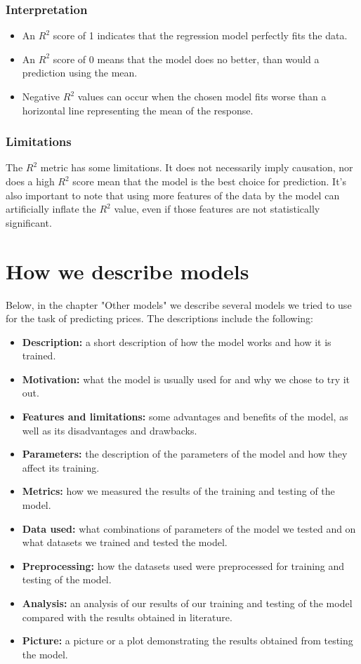 \subsubsection{Interpretation}
\begin{itemize}
	\item An \(R^2\) score of 1 indicates that the regression model perfectly fits the data.
	\item An \(R^2\) score of 0 means that the model does no better, than would a prediction using the mean.
	\item Negative \(R^2\) values can occur when the chosen model fits worse than a horizontal line representing the mean of the response.
\end{itemize}

\subsubsection{Limitations}
The \(R^2\) metric has some limitations. It does not necessarily imply causation, nor does a high \(R^2\) score mean that the model is the best choice for prediction. It's also important to note that using more features of the data by the model can artificially inflate the \(R^2\) value, even if those features are not statistically significant.


\section{How we describe models}
Below, in the chapter "Other models" we describe several models we tried to use for the task of predicting prices. The descriptions include the following:
\begin{itemize}
	\item \textbf{Description:} a short description of how the model works and how it is trained.
	\item \textbf{Motivation:} what the model is usually used for and why we chose to try it out.
	\item \textbf{Features and limitations:} some advantages and benefits of the model, as well as its disadvantages and drawbacks.
	\item \textbf{Parameters:} the description of the parameters of the model and how they affect its training.
	\item \textbf{Metrics:} how we measured the results of the training and testing of the model.
	\item \textbf{Data used:} what combinations of parameters of the model we tested and on what datasets we trained and tested the model.
	\item \textbf{Preprocessing:} how the datasets used were preprocessed for training and testing of the model.
	\item \textbf{Analysis:} an analysis of our results of our training and testing of the model compared with the results obtained in literature.
	\item \textbf{Picture:} a picture or a plot demonstrating the results obtained from testing the model.
\end{itemize}

